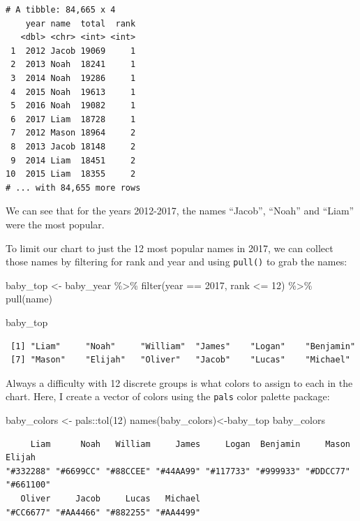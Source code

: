 \documentclass[
  letterpaper,
  DIV=11,
  numbers=noendperiod]{scrreprt}
\newenvironment{Shaded}{\begin{snugshade}}{\end{snugshade}}
\newcommand{\DecValTok}[1]{\textcolor[rgb]{0.68,0.00,0.00}{#1}}
\newcommand{\FunctionTok}[1]{\textcolor[rgb]{0.28,0.35,0.67}{#1}}
\newcommand{\NormalTok}[1]{\textcolor[rgb]{0.00,0.23,0.31}{#1}}
\newcommand{\OtherTok}[1]{\textcolor[rgb]{0.00,0.23,0.31}{#1}}
\newcommand{\SpecialCharTok}[1]{\textcolor[rgb]{0.37,0.37,0.37}{#1}}
\begin{document}
\begin{verbatim}
# A tibble: 84,665 x 4
    year name  total  rank
   <dbl> <chr> <int> <int>
 1  2012 Jacob 19069     1
 2  2013 Noah  18241     1
 3  2014 Noah  19286     1
 4  2015 Noah  19613     1
 5  2016 Noah  19082     1
 6  2017 Liam  18728     1
 7  2012 Mason 18964     2
 8  2013 Jacob 18148     2
 9  2014 Liam  18451     2
10  2015 Liam  18355     2
# ... with 84,655 more rows
\end{verbatim}

We can see that for the years 2012-2017, the names ``Jacob'', ``Noah''
and ``Liam'' were the most popular.

To limit our chart to just the 12 most popular names in 2017, we can
collect those names by filtering for rank and year and using
\texttt{pull()} to grab the names:

\begin{Shaded}
\begin{Highlighting}[]
\NormalTok{baby\_top }\OtherTok{\textless{}{-}}\NormalTok{ baby\_year }\SpecialCharTok{\%\textgreater{}\%}
  \FunctionTok{filter}\NormalTok{(year }\SpecialCharTok{==} \DecValTok{2017}\NormalTok{, rank }\SpecialCharTok{\textless{}=} \DecValTok{12}\NormalTok{) }\SpecialCharTok{\%\textgreater{}\%}
  \FunctionTok{pull}\NormalTok{(name)}

\NormalTok{baby\_top}
\end{Highlighting}
\end{Shaded}

\begin{verbatim}
 [1] "Liam"     "Noah"     "William"  "James"    "Logan"    "Benjamin"
 [7] "Mason"    "Elijah"   "Oliver"   "Jacob"    "Lucas"    "Michael" 
\end{verbatim}

Always a difficulty with 12 discrete groups is what colors to assign to
each in the chart. Here, I create a vector of colors using the
\texttt{pals} color palette package:

\begin{Shaded}
\begin{Highlighting}[]
\NormalTok{baby\_colors }\OtherTok{\textless{}{-}}\NormalTok{ pals}\SpecialCharTok{::}\FunctionTok{tol}\NormalTok{(}\DecValTok{12}\NormalTok{)}
\FunctionTok{names}\NormalTok{(baby\_colors)}\OtherTok{\textless{}{-}}\NormalTok{baby\_top}
\NormalTok{baby\_colors}
\end{Highlighting}
\end{Shaded}

\begin{verbatim}
     Liam      Noah   William     James     Logan  Benjamin     Mason    Elijah 
"#332288" "#6699CC" "#88CCEE" "#44AA99" "#117733" "#999933" "#DDCC77" "#661100" 
   Oliver     Jacob     Lucas   Michael 
"#CC6677" "#AA4466" "#882255" "#AA4499" 
\end{verbatim}
\end{document}
